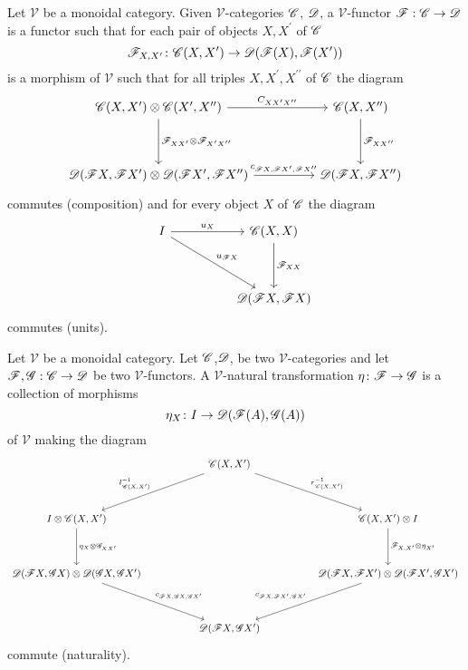 \documentclass[dissertation.tex]{subfiles}
\begin{document}
\begin{defn}
  Let $\mathscr{V}$ be a monoidal category.
  Given $\mathscr{V}$-categories $\mathscr{C}$, $\mathscr{D}$, a $\mathscr{V}$-functor $\mathscr{F} : \mathscr{C} \to \mathscr{D}$ is a functor such that for each pair of objects $X,X^\prime$ of $\mathscr{C}$
  $$\mathscr{F}_{X,X^\prime} \colon \mathscr{C}(X,X^\prime) \to \mathscr{D}(\mathscr{F}(X),\mathscr{F}(X^\prime))$$
  is a morphism of $\mathscr{V}$
  such that for all triples $X,X^\prime, X^{\prime\prime}$ of $\mathscr{C}$ the diagram
  $$\begin{tikzcd}
    \CC(X,X^\prime) \otimes \CC(X^\prime, X^{\prime\prime}) \arrow{rr}{C_{XX{^\prime}X^{\prime\prime}}}\arrow{dd}{\F_{XX^\prime} \otimes \F_{X^\prime X^{\prime\prime}}} && \CC(X,X^{\prime\prime})\arrow{dd}{\F_{XX^{\prime\prime}}}\\
    \\
    \D(\F X, \F X^\prime) \otimes \D(\F X^\prime, \F X^{\prime\prime}) \arrow{rr}{c_{\F X,\F X^\prime,\F X^{\prime\prime}}}&& \D(\F X, \F X^{\prime\prime})
  \end{tikzcd}$$
  commutes (composition)
  and for every object $X$ of $\mathscr{C}$ the diagram
  $$\begin{tikzcd}
    I \arrow{rr}{u_X}\arrow{rrdd}{u_{\F X}} && \CC(X,X)\arrow{dd}{\F_{XX}}\\
    \\
    &&\D(\F X, \F X)
  \end{tikzcd}$$
  commutes (units).
\end{defn}

\begin{defn}
  Let $\mathscr{V}$ be a monoidal category.
  Let $\mathscr{C}$,$\mathscr{D}$, be two $\mathscr{V}$-categories and let $\mathscr{F},\mathscr{G} : \mathscr{C} \to \mathscr{D}$ be two $\mathscr{V}$-functors.
  A $\mathscr{V}$-natural transformation $\eta \colon \mathscr{F} \to \mathscr{G}$ is a collection of morphisms
  $$\eta_X \colon I \to \mathscr{D}(\mathscr{F}(A), \mathscr{G}(A))$$
  of $\mathscr{V}$ making the diagram
  $$\begin{tikzcd}
    && \CC(X,X^\prime) \arrow[swap]{lldd}{l^{-1}_{\CC(X,X^\prime)}} \arrow{rrdd}{r^{-1}_{\CC(X,X^\prime)}}\\
    \\
    I \otimes \CC(X,X^\prime)\arrow{dd}{\eta_X \otimes \G_{XX^\prime}} &&&& \CC(X,X^\prime) \otimes I\arrow{dd}{\F_{X,X^\prime} \otimes \eta_{X^\prime}}\\
    \\
    \D(\F X, \G X) \otimes \D(\G X, \G X^\prime) \arrow{rrdd}{c_{\F X, \G X, \G X^\prime}} &&&& \D(\F X, \F X^\prime) \otimes \D(\F X^\prime, \G X^\prime) \arrow[swap]{lldd}{c_{\F X, \F X^\prime, \G X^\prime}}\\
    \\
    && \D(\F X, \G X^\prime)
  \end{tikzcd}$$
  commute (naturality).
\end{defn}
\end{document}
